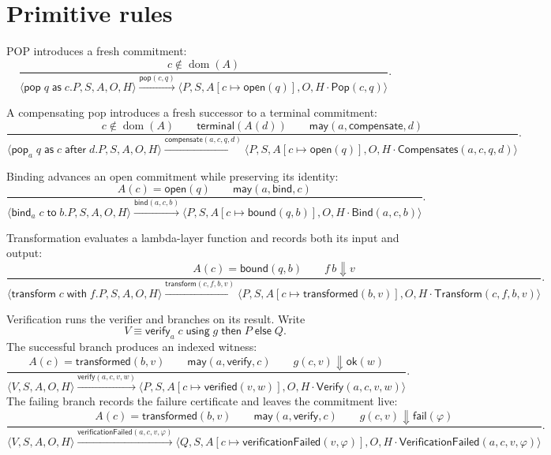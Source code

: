 \documentclass[11pt,openany]{book}
\theoremstyle{remark}
\newcommand{\Pop}{\mathsf{Pop}}
\newcommand{\Bind}{\mathsf{Bind}}
\newcommand{\Transform}{\mathsf{Transform}}
\newcommand{\Verify}{\mathsf{Verify}}
\newcommand{\Compensates}{\mathsf{Compensates}}
\newcommand{\dom}{\operatorname{dom}}
\begin{document}
\section{Primitive rules}

POP introduces a fresh commitment:
\[
\frac{c\notin\dom(A)}{
\langle \mathsf{pop}\;q\;\mathsf{as}\;c.P,S,A,O,H\rangle
\xrightarrow{\mathsf{pop}(c,q)}
\langle P,S,A[c\mapsto\mathsf{open}(q)],O,
H\cdot\Pop(c,q)\rangle}.
\]

A compensating pop introduces a fresh successor to a terminal
commitment:
{\footnotesize
\[
\frac{c\notin\dom(A)\qquad \mathsf{terminal}(A(d))\qquad
      \mathsf{may}(a,\mathsf{compensate},d)}{
\langle \mathsf{pop}_a\;q\;\mathsf{as}\;c\;\mathsf{after}\;d.P,S,A,O,H\rangle
\xrightarrow{\mathsf{compensate}(a,c,q,d)}
\langle P,S,A[c\mapsto\mathsf{open}(q)],O,
H\cdot\Compensates(a,c,q,d)\rangle}.
\]
}

Binding advances an open commitment while preserving its identity:
\[
\frac{A(c)=\mathsf{open}(q)\qquad
      \mathsf{may}(a,\mathsf{bind},c)}{
\langle \mathsf{bind}_a\;c\;\mathsf{to}\;b.P,S,A,O,H\rangle
\xrightarrow{\mathsf{bind}(a,c,b)}
\langle P,S,A[c\mapsto\mathsf{bound}(q,b)],O,
H\cdot\Bind(a,c,b)\rangle}.
\]

Transformation evaluates a lambda-layer function and records both its
input and output:
{\footnotesize
\[
\frac{A(c)=\mathsf{bound}(q,b)\qquad f\,b\Downarrow v}{
\langle \mathsf{transform}\;c\;\mathsf{with}\;f.P,S,A,O,H\rangle
\xrightarrow{\mathsf{transform}(c,f,b,v)}
\langle P,S,A[c\mapsto\mathsf{transformed}(b,v)],O,
H\cdot\Transform(c,f,b,v)\rangle}.
\]
}

Verification runs the verifier and branches on its result. Write
\[
V\equiv\mathsf{verify}_a\;c\;\mathsf{using}\;g\;\mathsf{then}\;P\;
\mathsf{else}\;Q.
\]
The successful branch produces an indexed witness:
{\footnotesize
\[
\frac{A(c)=\mathsf{transformed}(b,v)\qquad
      \mathsf{may}(a,\mathsf{verify},c)\qquad
      g(c,v)\Downarrow\mathsf{ok}(w)}{
\langle V,S,A,O,H\rangle
\xrightarrow{\mathsf{verify}(a,c,v,w)}
\langle P,S,A[c\mapsto\mathsf{verified}(v,w)],O,
H\cdot\Verify(a,c,v,w)\rangle}.
\]
}
The failing branch records the failure certificate and leaves the
commitment live:
{\footnotesize
\[
\frac{A(c)=\mathsf{transformed}(b,v)\qquad
      \mathsf{may}(a,\mathsf{verify},c)\qquad
      g(c,v)\Downarrow\mathsf{fail}(\varphi)}{
\langle V,S,A,O,H\rangle
\xrightarrow{\mathsf{verificationFailed}(a,c,v,\varphi)}
\langle Q,S,A[c\mapsto\mathsf{verificationFailed}(v,\varphi)],O,
H\cdot\mathsf{VerificationFailed}(a,c,v,\varphi)\rangle}.
\]
}
\end{document}
